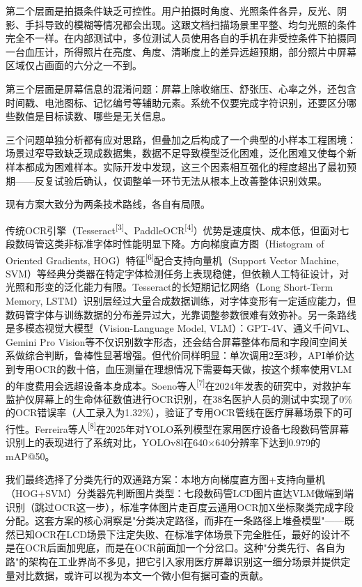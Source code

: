 \documentclass[zihao=-4,a4paper]{ctexart}
\numberwithin{figure}{section}
\numberwithin{table}{section}
\begin{document}
第二个层面是拍摄条件缺乏可控性。用户拍摄时角度、光照条件各异，反光、阴影、手抖导致的模糊等情况都会出现。这跟文档扫描场景里平整、均匀光照的条件完全不一样。在内部测试中，多位测试人员使用各自的手机在非受控条件下拍摄同一台血压计，所得照片在亮度、角度、清晰度上的差异远超预期，部分照片中屏幕区域仅占画面的六分之一不到。

第三个层面是屏幕信息的混淆问题：屏幕上除收缩压、舒张压、心率之外，还包含时间戳、电池图标、记忆编号等辅助元素。系统不仅要完成字符识别，还要区分哪些数值是目标读数、哪些是无关信息。

三个问题单独分析都有应对思路，但叠加之后构成了一个典型的小样本工程困境：场景过窄导致缺乏现成数据集，数据不足导致模型泛化困难，泛化困难又使每个新样本都成为困难样本。实际开发中发现，这三个因素相互强化的程度超出了最初预期——反复试验后确认，仅调整单一环节无法从根本上改善整体识别效果。

现有方案大致分为两条技术路线，各自有局限。

传统OCR引擎（Tesseract\textsuperscript{[3]}、PaddleOCR\textsuperscript{[4]}）优势是速度快、成本低，但面对七段数码管这类非标准字体时性能明显下降。方向梯度直方图（Histogram of Oriented Gradients, HOG）特征\textsuperscript{[6]}配合支持向量机（Support Vector Machine, SVM）等经典分类器在特定字体检测任务上表现稳健，但依赖人工特征设计，对光照和形变的泛化能力有限。Tesseract的长短期记忆网络（Long Short-Term Memory, LSTM）识别层经过大量合成数据训练，对字体变形有一定适应能力，但数码管字体与训练数据的分布差异过大，光靠调整参数很难有效弥补。另一条路线是多模态视觉大模型（Vision-Language Model, VLM）：GPT-4V、通义千问VL、Gemini Pro Vision等不仅识别数字形态，还会结合屏幕整体布局和字段间空间关系做综合判断，鲁棒性显著增强。但代价同样明显：单次调用2至3秒，API单价达到专用OCR的数十倍，血压测量在理想情况下需要每天做，按这个频率使用VLM的年度费用会远超设备本身成本。Soeno等人\textsuperscript{[7]}在2024年发表的研究中，对救护车监护仪屏幕上的生命体征数值进行OCR识别，在38名医护人员的测试中实现了0\%的OCR错误率（人工录入为1.32\%），验证了专用OCR管线在医疗屏幕场景下的可行性。Ferreira等人\textsuperscript{[8]}在2025年对YOLO系列模型在家用医疗设备七段数码管屏幕识别上的表现进行了系统对比，YOLOv8l在640×640分辨率下达到0.979的mAP@50。

我们最终选择了分类先行的双通路方案：本地方向梯度直方图+支持向量机（HOG+SVM）分类器先判断图片类型：七段数码管LCD图片直达VLM做端到端识别（跳过OCR这一步），标准字体图片走百度云通用OCR加X坐标聚类完成字段分配。这套方案的核心洞察是"分类决定路径，而非在一条路径上堆叠模型"——既然已知OCR在LCD场景下注定失败、在标准字体场景下完全胜任，最好的设计不是在OCR后面加兜底，而是在OCR前面加一个分岔口。这种"分类先行、各自为路"的架构在工业界尚不多见，把它引入家用医疗屏幕识别这一细分场景并提供定量对比数据，或许可以视为本文一个微小但有据可查的贡献。
\end{document}
